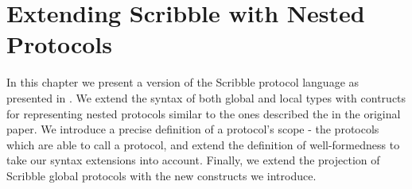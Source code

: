 \documentclass[12pt,twoside]{report}
\begin{document}


\chapter{Extending Scribble with Nested Protocols}\label{scribble-extensions-chapter}
In this chapter we present a version of the Scribble protocol language as presented in \cite{scribble}. We extend the syntax of both global and local types with contructs for representing nested protocols similar to the ones described the in the original paper\cite{nestedprotocols}. We introduce a precise definition of a protocol's scope - the protocols which are able to call a protocol, and extend the definition of well-formedness to take our syntax extensions into account. Finally, we extend the projection of Scribble global protocols with the new constructs we introduce.
\end{document}
